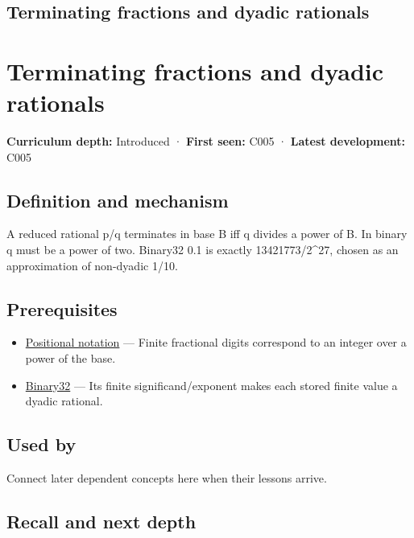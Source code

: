 \hypertarget{appendix-2a2f1b74bdd3}{}
\section*{Terminating fractions and dyadic rationals}
\chapter{Terminating fractions and dyadic rationals}\label{appendix-2a2f1b74bdd3-terminating-fractions-and-dyadic-rationals}

\textbf{Curriculum depth:} Introduced · \textbf{First seen:} C005 · \textbf{Latest development:} C005

\section{Definition and mechanism}\label{appendix-2a2f1b74bdd3-definition-and-mechanism}

A reduced rational p/q terminates in base B iff q divides a power of B. In binary q must be a power of two. Binary32 0.1 is exactly 13421773/2\^{}27, chosen as an approximation of non-dyadic 1/10.

\section{Prerequisites}\label{appendix-2a2f1b74bdd3-prerequisites}

\begin{itemize}
\tightlist
\item
  \hyperref[appendix-83c3f28f7bda]{Positional notation} --- Finite fractional digits correspond to an integer over a power of the base.
\item
  \hyperref[appendix-5057f9ad327f]{Binary32} --- Its finite significand/exponent makes each stored finite value a dyadic rational.
\end{itemize}

\section{Used by}\label{appendix-2a2f1b74bdd3-used-by}

Connect later dependent concepts here when their lessons arrive.

\section{Recall and next depth}\label{appendix-2a2f1b74bdd3-recall-and-next-depth}

